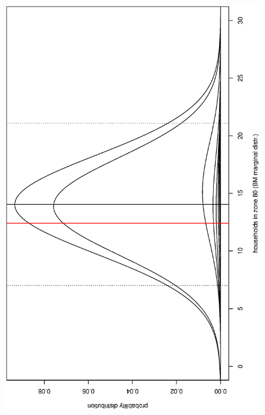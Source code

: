 \documentclass[11pt, fleqn]{article}
\begin{document}
\begin{figure}[t]
\begin{center}
\begin{minipage}{8cm}
\includegraphics[scale=0.3, angle=-90]{pic/hu_bm_distr_zone80.ps}
\end{minipage}
\hfill
\begin{minipage}{8cm}

\end{minipage}
\end{center}
\end{figure}
\end{document}

